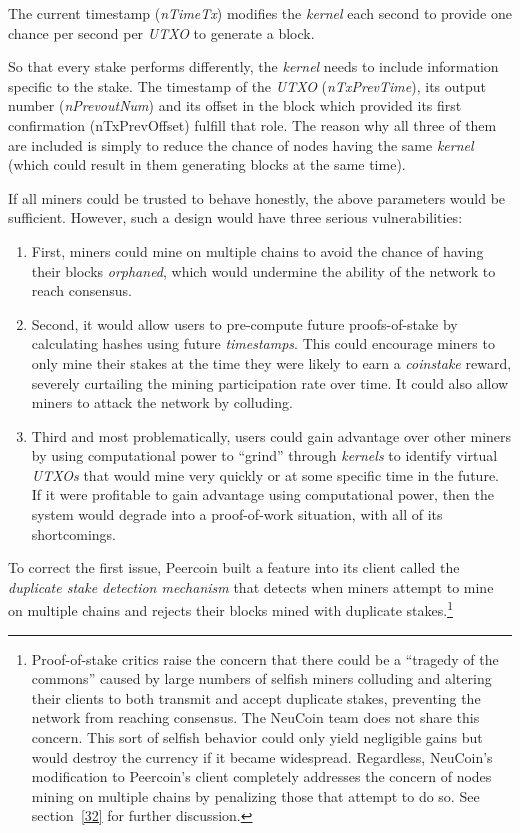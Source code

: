 \documentclass[a4paper,11pt]{article}
\begin{document}
The current timestamp (\textit{nTimeTx}) modifies the \textit{kernel} each second to provide one chance per second per \textit{UTXO} to generate a block. 

So that every stake performs differently, the \textit{kernel} needs to include information specific to the stake. The timestamp of the \textit{UTXO} (\textit{nTxPrevTime}), its output number (\textit{nPrevoutNum}) and its offset in the block which provided its first confirmation (nTxPrevOffset) fulfill that role. The reason why all three of them are included is simply to reduce the chance of nodes having the same \textit{kernel} (which could result in them generating blocks at the same time).

If all miners could be trusted to behave honestly, the above parameters would be sufficient. However, such a design would have three serious vulnerabilities:
\begin{enumerate}
\item{First, miners could mine on multiple chains to avoid the chance of having their blocks \textit{orphaned}, which would undermine the ability of the network to reach consensus.}
\item{Second, it would allow users to pre-compute future proofs-of-stake by calculating hashes using future \textit{timestamps}. This could encourage miners to only mine their stakes at the time they were likely to earn a \textit{\textit{coinstake}} reward, severely curtailing the mining participation rate over time. It could also allow miners to attack the network by colluding.}
\item{Third and most problematically, users could gain advantage over other miners by using computational power to ``grind'' through \textit{\textit{kernels}} to identify virtual \textit{UTXOs} that would mine very quickly or at some specific time in the future. If it were profitable to gain advantage using computational power, then the system would degrade into a proof-of-work situation, with all of its shortcomings.}
\end{enumerate}

To correct the first issue, Peercoin built a feature into its client called the \textit{duplicate stake detection mechanism} that detects when miners attempt to mine on multiple chains and rejects their blocks mined with duplicate stakes.\footnote{Proof-of-stake critics raise the concern that there could be a “tragedy of the commons” caused by large numbers of selfish miners colluding and altering their clients to both transmit and accept duplicate stakes, preventing the network from reaching consensus. The NeuCoin team does not share this concern. This sort of selfish behavior could only yield negligible gains but would destroy the currency if it became widespread. Regardless, NeuCoin's modification to Peercoin's client completely addresses the concern of nodes mining on multiple chains by penalizing those that attempt to do so. See section~\ref{32} for further discussion.}
\end{document}
